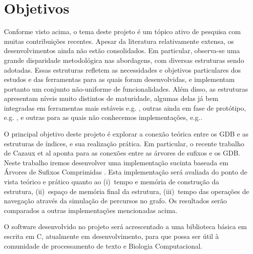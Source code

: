 \documentclass[12pt, a4paper, oneside]{article}
\begin{document}
\clearpage
\section{Objetivos}

Conforme visto acima, o tema deste projeto é um tópico ativo de pesquisa com muitas contribuições recentes. Apesar da literatura relativamente extensa, os desenvolvimentos ainda não estão consolidados. Em particular, observa-se uma grande disparidade metodológica nas abordagens, com diversas estruturas sendo adotadas. Essas estruturas refletem as necessidades e objetivos particulares dos estudos e das ferramentas para as quais foram desenvolvidas, e implementam portanto um conjunto não-uniforme de funcionalidades. Além disso, as estruturas apresentam níveis muito distintos de maturidade, algumas delas já bem integradas em ferramentas mais estáveis e.g.  \cite{Chikhi2013, Salikhov2014}, outras ainda em fase de protótipo, e.g. \cite{Bowe2012, Rodland2013}, e outras para as quais não conhecemos implementações, e.g.\cite{Cazaux2016}.

O principal objetivo deste projeto é explorar a conexão teórica entre os GDB e as estruturas de índices, e sua realização prática. Em particular, o recente trabalho de Cazaux et al \cite{Cazaux2016} aponta para as conexões entre as árvores de sufixos e os GDB. Neste trabalho iremos desenvolver uma implementação sucinta baseada em Árvores de Sufixos Comprimidas \cite{Sadakane2007}. Esta implementação será avaliada do ponto de vista teórico e prático quanto ao (i)~tempo e memória de construção da estrutura, (ii)~espaço de memória final da estrutura, (iii)~tempo das operações de navegação através da simulação de percursos no grafo. Os resultados serão comparados a outras implementações mencionadas acima.


O software desenvolvido no projeto será acrescentado a uma biblioteca básica em escrita em C, atualmente em desenvolvimento, para que possa ser útil à comunidade de processamento de texto e Biologia Computacional.
\end{document}
